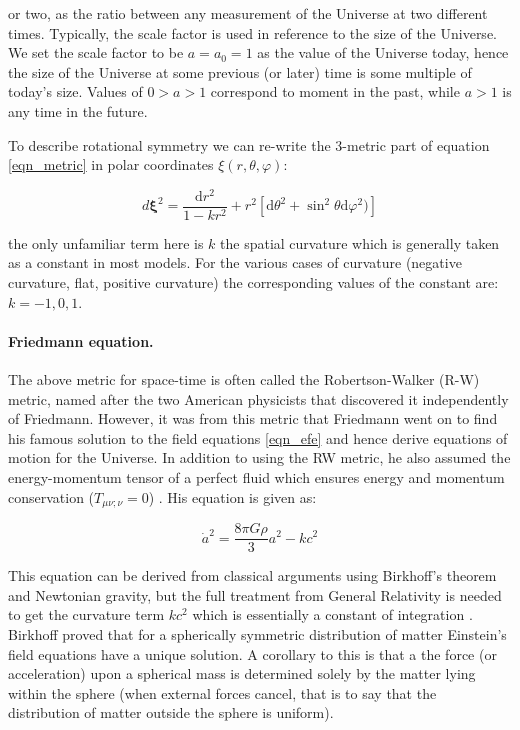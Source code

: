 \noindent or two, as the ratio between any measurement of the Universe at two different times. Typically, the scale factor is used in reference to the size of the Universe. We set the scale factor to be $ a = a_0 = 1$ as the value of the Universe today, hence the size of the Universe at some previous (or later) time is some multiple of today's size. Values of $0 > a > 1$ correspond to moment in the past, while $a > 1$ is any time in the future.

To describe rotational symmetry we can re-write the 3-metric part of equation \ref{eqn_metric} in polar coordinates $ \xi(r,\theta,\varphi)$:

\begin{equation}
d\mathbf{\xi}^2 = \frac{\mathrm{d}r^2}{1-k r^2} + r^2 [\mathrm{d}\theta^2 + \sin^2 \theta \mathrm{d}\varphi^2)]
\end{equation}

\noindent the only unfamiliar term here is $k$ the spatial curvature which is generally taken as a constant in most models. For the various cases of curvature (negative curvature, flat, positive curvature) the corresponding values of the constant are: $k= -1, 0, 1$. 

\paragraph{Friedmann equation.} The above metric for space-time is often called the Robertson-Walker (R-W) metric, named after the two American physicists that discovered it independently of Friedmann. However, it was from this metric that Friedmann went on to find his famous solution to the field equations \ref{eqn_efe} and hence derive equations of motion for the Universe. In addition to using the RW metric, he also assumed the energy-momentum tensor of a perfect fluid which ensures energy and momentum conservation ($T_{\mu\nu;\nu} = 0$) \citep{bib_schutz}. His equation is given as:

\begin{equation}
\label{eqn_fre}
\dot a^2 = \frac{8\pi G\rho}{3} a^2 - kc^2
\end{equation}

\noindent This equation can be derived from classical arguments using Birkhoff's theorem and Newtonian gravity, but the full treatment from General Relativity is needed to get the curvature term $kc^2$ which is essentially a constant of integration \citep{bib_pea}. Birkhoff proved that for a spherically symmetric distribution of matter Einstein's field equations have a unique solution. A corollary to this is that a the force (or acceleration) upon a spherical mass is determined solely by the matter lying within the sphere (when external forces cancel, that is to say that the distribution of matter outside the sphere is uniform).

